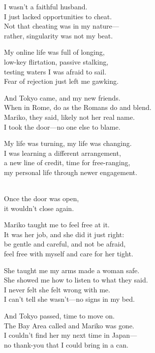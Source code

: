 \begin{lyrics}
I wasn’t a faithful husband.\\
I just lacked opportunities to cheat.\\
Not that cheating was in my nature—\\
rather, singularity was not my beat.

My online life was full of longing,\\
low-key flirtation, passive stalking,\\
testing waters I was afraid to sail.\\
Fear of rejection just left me gawking.

And Tokyo came, and my new friends.\\
When in Rome, do as the Romans do and blend.\\
Mariko, they said, likely not her real name.\\
I took the door—no one else to blame.

My life was turning, my life was changing.\\
I was learning a different arrangement,\\
a new line of credit, time for free-ranging,\\
my personal life through newer engagement.

\\
Once the door was open,\\
it wouldn’t close again.

Mariko taught me to feel free at it.\\
It was her job, and she did it just right:\\
be gentle and careful, and not be afraid,\\
feel free with myself and care for her tight.

She taught me my arms made a woman safe.\\
She showed me how to listen to what they said.\\
I never felt she felt wrong with me.\\
I can’t tell she wasn’t—no signs in my bed.

And Tokyo passed, time to move on.\\
The Bay Area called and Mariko was gone.\\
I couldn’t find her my next time in Japan—\\
no thank-you that I could bring in a can.


\end{lyrics}
